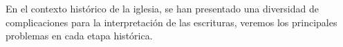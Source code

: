 En el contexto histórico de la iglesia, se han presentado una diversidad de complicaciones para la interpretación de las escrituras, veremos los principales problemas en cada etapa histórica.